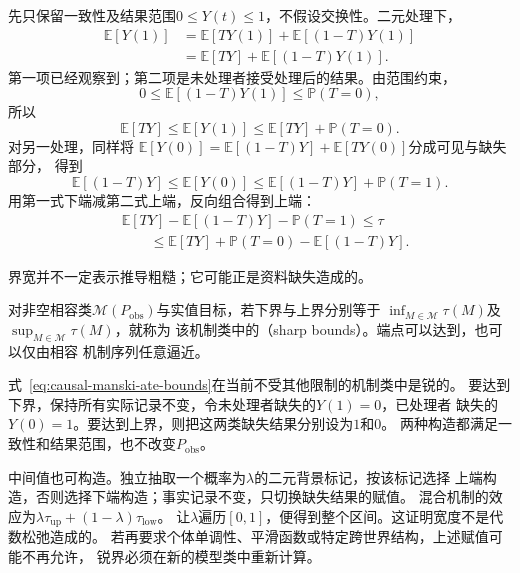 先只保留一致性及结果范围\(0\leq Y(t)\leq1\)，不假设交换性。二元处理下，
\[
  \begin{aligned}
    \mathbb E[Y(1)]
    &=\mathbb E[TY(1)]+\mathbb E[(1-T)Y(1)]\\
    &=\mathbb E[TY]+\mathbb E[(1-T)Y(1)].
  \end{aligned}
\]
第一项已经观察到；第二项是未处理者接受处理后的结果。由范围约束，
\[
  0\leq\mathbb E[(1-T)Y(1)]\leq\mathbb P(T=0),
\]
所以
\begin{equation}
  \mathbb E[TY]\leq\mathbb E[Y(1)]
  \leq\mathbb E[TY]+\mathbb P(T=0).
  \label{eq:causal-bounded-outcome-y1}
\end{equation}
对另一处理，同样将
\(\mathbb E[Y(0)]=\mathbb E[(1-T)Y]+\mathbb E[TY(0)]\)分成可见与缺失部分，
得到
\begin{equation}
  \mathbb E[(1-T)Y]\leq\mathbb E[Y(0)]
  \leq\mathbb E[(1-T)Y]+\mathbb P(T=1).
  \label{eq:causal-bounded-outcome-y0}
\end{equation}
用第一式下端减第二式上端，反向组合得到上端：
\begin{equation}
  \begin{aligned}
    &\mathbb E[TY]-\mathbb E[(1-T)Y]-\mathbb P(T=1)
      \leq\tau\\
    &\qquad\leq
      \mathbb E[TY]+\mathbb P(T=0)-\mathbb E[(1-T)Y].
  \end{aligned}
  \label{eq:causal-manski-ate-bounds}
\end{equation}

界宽并不一定表示推导粗糙；它可能正是资料缺失造成的。
\begin{definition}[相容机制类中的锐界]
  \label{def:causal-sharp-bounds}
  对非空相容类\(\mathcal M(P_{\mathrm{obs}})\)与实值目标，若下界与上界分别等于
  \(\inf_{M\in\mathcal M}\tau(M)\)及\(\sup_{M\in\mathcal M}\tau(M)\)，就称为
  该机制类中的（sharp bounds）。端点可以达到，也可以仅由相容
  机制序列任意逼近。
\end{definition}

式~\eqref{eq:causal-manski-ate-bounds}在当前不受其他限制的机制类中是锐的。
要达到下界，保持所有实际记录不变，令未处理者缺失的\(Y(1)=0\)，已处理者
缺失的\(Y(0)=1\)。要达到上界，则把这两类缺失结果分别设为\(1\)和\(0\)。
两种构造都满足一致性和结果范围，也不改变\(P_{\mathrm{obs}}\)。

中间值也可构造。独立抽取一个概率为\(\lambda\)的二元背景标记，按该标记选择
上端构造，否则选择下端构造；事实记录不变，只切换缺失结果的赋值。
混合机制的效应为\(\lambda\tau_{\mathrm{up}}+(1-\lambda)\tau_{\mathrm{low}}\)。
让\(\lambda\)遍历\([0,1]\)，便得到整个区间。这证明宽度不是代数松弛造成的。
若再要求个体单调性、平滑函数或特定跨世界结构，上述赋值可能不再允许，
锐界必须在新的模型类中重新计算。

